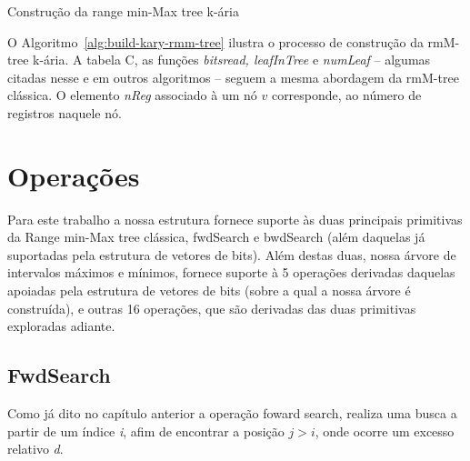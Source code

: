\begin{algorithm}[h!]
{{{                    
                }
    
            }
        } 
        \caption{Construção da range min-Max tree k-ária}
        \label{alg:build-kary-rmm-tree}
    \end{algorithm} 

O Algoritmo~\ref{alg:build-kary-rmm-tree} ilustra o processo de construção da rmM-tree k-ária. A tabela C, as funções \textit{bitsread, leafInTree} e \textit{numLeaf} -- algumas citadas nesse e em outros algoritmos -- seguem a mesma abordagem da rmM-tree clássica. O elemento \textit{nReg} associado à um nó $v$ corresponde, ao número de registros naquele nó.



\section{Operações}\label{sec:optimized-operation}
Para este trabalho a nossa estrutura fornece suporte às duas principais primitivas da Range min-Max tree clássica, fwdSearch e bwdSearch (além daquelas já suportadas pela estrutura de vetores de bits). Além destas duas, nossa árvore de intervalos máximos e mínimos, fornece suporte à 5 operações derivadas daquelas apoiadas pela estrutura de vetores de bits (sobre a qual a nossa árvore é construída), e outras 16 operações, que são derivadas das duas primitivas exploradas adiante.


\subsection{FwdSearch}\label{sec:fwdSearch}
Como já dito no capítulo anterior a operação foward search, realiza uma busca a partir de um índice \textit{i}, afim de encontrar a posição $j>i$, onde ocorre um excesso relativo \textit{d}.


